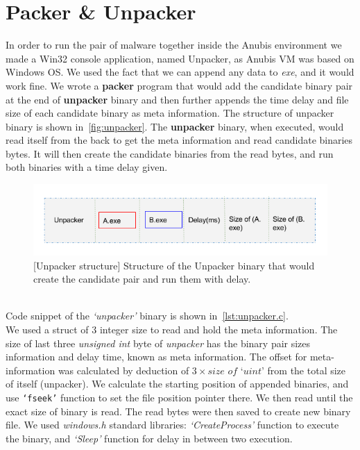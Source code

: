 \section{Packer \& Unpacker}
\label{sec:packerunpacker}
In order to run the pair of malware together inside the Anubis environment we made a Win32 console application, named Unpacker, as Anubis VM was based on Windows OS.\@
We used the fact that we can append any data to \emph{exe}, and it would work fine.
We wrote a \textbf{packer} program that would add the candidate binary pair at the end of \textbf{unpacker} binary and then further appends the time delay and file size of each candidate binary as meta information.
The structure of unpacker binary is shown in~\autoref{fig:unpacker}.
The \textbf{unpacker} binary, when executed, would read itself from the back to get the meta information and read candidate binaries bytes.
It will then create the candidate binaries from the read bytes, and run both binaries with a time delay given.\\
\begin{figure}[htbp]
  \centering
  \includegraphics[scale=0.5]{figures/unpacker.png}
\caption{[Unpacker structure] Structure of the Unpacker binary that would create the candidate pair and run them with delay.}
\label{fig:unpacker}
\end{figure}
\\
Code snippet of the \emph{`unpacker'} binary is shown in~\autoref{lst:unpacker.c}.\\
We used a struct of 3 integer size to read and hold the meta information. The size of last three \textit{unsigned int} byte of \emph{unpacker} has the binary pair sizes information and delay time, known as meta information.
The offset for meta-information was calculated by deduction of $3 \times \textit{size of `uint'}$ from the total size of itself (unpacker).
We calculate the starting position of appended binaries, and use \texttt{`fseek\(\)'} function to set the file position pointer there.
We then read until the exact size of binary is read.
The read bytes were then saved to create new binary file.
We used \emph{windows.h} standard libraries: \emph{`CreateProcess'} function to execute the binary, and \emph{`Sleep'} function for delay in between two execution.\\

